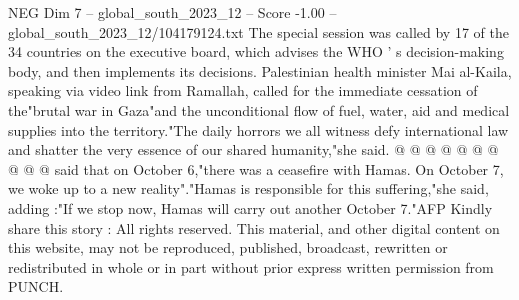 \begin{textsample}{NEG Dim 7 – global\_south\_2023\_12 – Score -1.00 – global\_south\_2023\_12/104179124.txt}
The special session was called by 17 of the 34 countries on the executive board, which advises the WHO ' s decision-making body, and then implements its decisions.
Palestinian health minister Mai al-Kaila, speaking via video link from Ramallah, called for the immediate cessation of the"brutal war in Gaza"and the unconditional flow of fuel, water, aid and medical supplies into the territory."The daily horrors we all witness defy international law and shatter the very essence of our shared humanity,"she said. @ @ @ @ @ @ @ @ @ @ said that on October 6,"there was a ceasefire with Hamas.
On October 7, we woke up to a new reality"."Hamas is responsible for this suffering,"she said, adding :"If we stop now, Hamas will carry out another October 7."AFP Kindly share this story : All rights reserved.
This material, and other digital content on this website, may not be reproduced, published, broadcast, rewritten or redistributed in whole or in part without prior express written permission from PUNCH.

\end{textsample}
